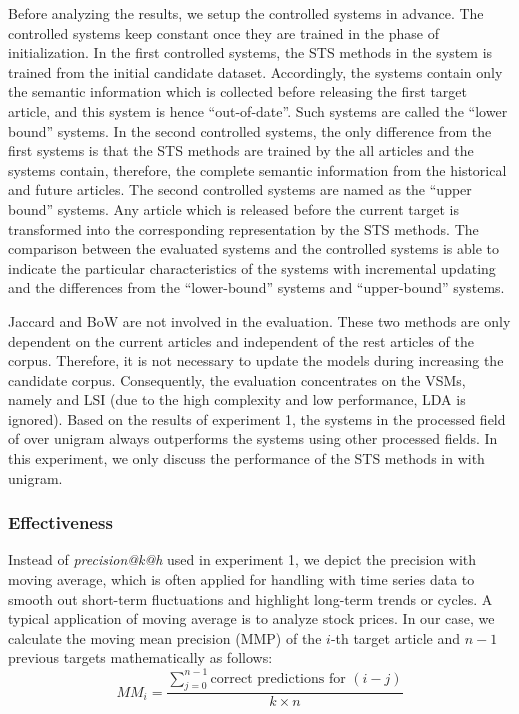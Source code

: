 Before analyzing the results, we setup the controlled systems in advance. The controlled systems keep constant once they are trained in the phase of initialization. In the first controlled systems, the STS methods in the system is trained from the initial candidate dataset. Accordingly, the systems contain only the semantic information which is collected before releasing the first target article, and this system is hence ``out-of-date''. Such systems are called the ``lower bound'' systems. In the second controlled systems, the only difference from the first systems is that the STS methods are trained by the all articles and the systems contain, therefore, the complete semantic information from the historical and future articles. The second controlled systems are named as the ``upper bound'' systems. Any article which is released before the current target is transformed into the corresponding representation by the STS methods.  The comparison between the evaluated systems and the controlled systems is able to indicate the particular characteristics of the systems with incremental updating and the differences from the ``lower-bound'' systems and ``upper-bound'' systems. 

Jaccard and BoW are not involved in the evaluation. These two methods are only dependent on the current articles and independent of the rest articles of the corpus. Therefore, it is not necessary to update the models during increasing the candidate corpus. Consequently, the evaluation concentrates on the VSMs, namely \tfidf{} and LSI (due to the high complexity and low performance, LDA is ignored). Based on the results of experiment 1, the systems in the processed field of \icontent{} over unigram always outperforms the systems using other processed fields. In this experiment, we only discuss the performance of the STS methods in \icontent{} with unigram. 

\subsubsection{Effectiveness}

Instead of \textit{precision@k@h} used in experiment 1, we depict the precision with moving average, which is often applied for handling with time series data to smooth out short-term fluctuations and highlight long-term trends or cycles. A typical application of moving average is to analyze stock prices. In our case, we calculate the moving mean precision (MMP) of the $i$-th target article and $n-1$ previous targets mathematically as follows:
\begin{equation}
    MM_{i} = \frac{\sum^{n-1}_{j=0} \text{correct predictions for }(i-j)}{k\times n}
\end{equation}

